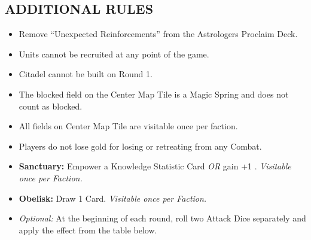 \begin{multicols*}{2}
\subsection*{\MakeUppercase{Additional Rules}}
\begin{itemize}
  \item Remove ``Unexpected Reinforcements'' from the Astrologers Proclaim Deck.
  \item {} Units cannot be recruited at any point of the game.
  \item Citadel cannot be built on Round 1.
  \item The blocked field on the Center Map Tile is a Magic Spring and does not count as blocked.
  \item All fields on Center Map Tile are visitable once per faction.
  \item Players do not lose gold for losing or retreating from any Combat.
  \item \textbf{Sanctuary:} Empower a Knowledge Statistic Card \textit{OR} gain +1 . \textit{Visitable once per Faction.}
  \item \textbf{Obelisk:} Draw 1 Card. \textit{Visitable once per Faction.}
  \item \textit{Optional:} At the beginning of each round, roll two Attack Dice separately and apply the effect from the table below.
\end{itemize}

\end{multicols*}
